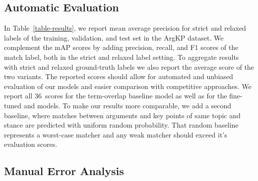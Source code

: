 \subsection{Automatic Evaluation}

In Table~\ref{table-results}, we report mean average precision for strict and relaxed labels of the training, validation, and test set in the ArgKP dataset.
We complement the mAP scores by adding precision, recall, and F1 scores of the match label, both in the strict and relaxed label setting.
To aggregate results with strict and relaxed ground-truth labels we also report the average score of the two variants.
The reported scores should allow for automated and unbiased evaluation of our models and easier comparison with competitive approaches.
We report all 36~scores for the term-overlap baseline model as well as for the fine-tuned \BertBase and \RobertaBase models.
To make our results more comparable, we add a second baseline, where matches between arguments and key points of same topic and stance are predicted with uniform random probability.
That random baseline represents a worst-case matcher and any weak matcher should exceed it's evaluation scores.


\subsection{Manual Error Analysis}


